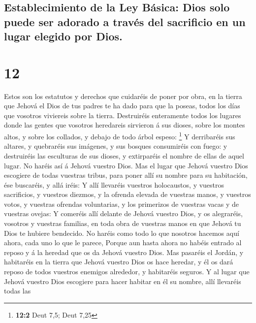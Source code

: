 \hypertarget{establecimiento-de-la-ley-buxe1sica-dios-solo-puede-ser-adorado-a-travuxe9s-del-sacrificio-en-un-lugar-elegido-por-dios.}{%
\subsection{Establecimiento de la Ley Básica: Dios solo puede ser
adorado a través del sacrificio en un lugar elegido por
Dios.}\label{establecimiento-de-la-ley-buxe1sica-dios-solo-puede-ser-adorado-a-travuxe9s-del-sacrificio-en-un-lugar-elegido-por-dios.}}

\hypertarget{section-11}{%
\section{12}\label{section-11}}

 Estos son los estatutos y derechos que cuidaréis de poner
por obra, en la tierra que Jehová el Dios de tus padres te ha dado para
que la poseas, todos los días que vosotros viviereis sobre la tierra.
 Destruiréis enteramente todos los lugares donde las gentes
que vosotros heredareis sirvieron á sus dioses, sobre los montes altos,
y sobre los collados, y debajo de todo árbol espeso: \footnote{\textbf{12:2}
  Deut 7,5; Deut 7,25}  Y derribaréis sus altares, y
quebraréis sus imágenes, y sus bosques consumiréis con fuego: y
destruiréis las esculturas de sus dioses, y extirparéis el nombre de
ellas de aquel lugar.  No haréis así á Jehová vuestro Dios.
 Mas el lugar que Jehová vuestro Dios escogiere de todas
vuestras tribus, para poner allí su nombre para su habitación, ése
buscaréis, y allá iréis:  Y allí llevaréis vuestros
holocaustos, y vuestros sacrificios, y vuestros diezmos, y la ofrenda
elevada de vuestras manos, y vuestros votos, y vuestras ofrendas
voluntarias, y los primerizos de vuestras vacas y de vuestras ovejas:
 Y comeréis allí delante de Jehová vuestro Dios, y os
alegraréis, vosotros y vuestras familias, en toda obra de vuestras manos
en que Jehová tu Dios te hubiere bendecido.  No haréis como
todo lo que nosotros hacemos aquí ahora, cada uno lo que le parece,
 Porque aun hasta ahora no habéis entrado al reposo y á la
heredad que os da Jehová vuestro Dios.  Mas pasaréis el
Jordán, y habitaréis en la tierra que Jehová vuestro Dios os hace
heredar, y él os dará reposo de todos vuestros enemigos alrededor, y
habitaréis seguros.  Y al lugar que Jehová vuestro Dios
escogiere para hacer habitar en él su nombre, allí llevaréis todas las

